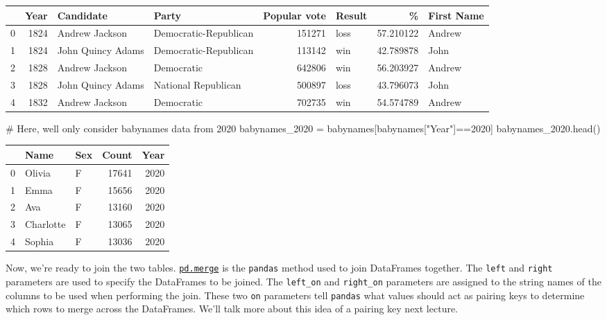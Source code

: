 \documentclass[
  letterpaper,
  DIV=11,
  numbers=noendperiod]{scrreprt}
\newenvironment{Shaded}{\begin{snugshade}}{\end{snugshade}}
\newcommand{\CommentTok}[1]{\textcolor[rgb]{0.37,0.37,0.37}{#1}}
\newcommand{\DecValTok}[1]{\textcolor[rgb]{0.68,0.00,0.00}{#1}}
\newcommand{\NormalTok}[1]{\textcolor[rgb]{0.00,0.23,0.31}{#1}}
\newcommand{\OperatorTok}[1]{\textcolor[rgb]{0.37,0.37,0.37}{#1}}
\newcommand{\StringTok}[1]{\textcolor[rgb]{0.13,0.47,0.30}{#1}}
\begin{document}
\begin{tabular}{lrllrlrl}
\toprule
{} &  Year &          Candidate &                  Party &  Popular vote & Result &          \% & First Name \\
\midrule
0 &  1824 &     Andrew Jackson &  Democratic-Republican &        151271 &   loss &  57.210122 &     Andrew \\
1 &  1824 &  John Quincy Adams &  Democratic-Republican &        113142 &    win &  42.789878 &       John \\
2 &  1828 &     Andrew Jackson &             Democratic &        642806 &    win &  56.203927 &     Andrew \\
3 &  1828 &  John Quincy Adams &    National Republican &        500897 &   loss &  43.796073 &       John \\
4 &  1832 &     Andrew Jackson &             Democratic &        702735 &    win &  54.574789 &     Andrew \\
\bottomrule
\end{tabular}

\begin{Shaded}
\begin{Highlighting}[]
\CommentTok{\# Here, we\textquotesingle{}ll only consider \textasciigrave{}babynames\textasciigrave{} data from 2020}
\NormalTok{babynames\_2020 }\OperatorTok{=}\NormalTok{ babynames[babynames[}\StringTok{"Year"}\NormalTok{]}\OperatorTok{==}\DecValTok{2020}\NormalTok{]}
\NormalTok{babynames\_2020.head()}
\end{Highlighting}
\end{Shaded}

\begin{tabular}{lllrr}
\toprule
{} &       Name & Sex &  Count &  Year \\
\midrule
0 &     Olivia &   F &  17641 &  2020 \\
1 &       Emma &   F &  15656 &  2020 \\
2 &        Ava &   F &  13160 &  2020 \\
3 &  Charlotte &   F &  13065 &  2020 \\
4 &     Sophia &   F &  13036 &  2020 \\
\bottomrule
\end{tabular}

Now, we're ready to join the two tables.
\href{https://pandas.pydata.org/docs/reference/api/pandas.DataFrame.merge.html}{\texttt{pd.merge}}
is the \texttt{pandas} method used to join DataFrames together. The
\texttt{left} and \texttt{right} parameters are used to specify the
DataFrames to be joined. The \texttt{left\_on} and \texttt{right\_on}
parameters are assigned to the string names of the columns to be used
when performing the join. These two \texttt{on} parameters tell
\texttt{pandas} what values should act as pairing keys to determine
which rows to merge across the DataFrames. We'll talk more about this
idea of a pairing key next lecture.
\end{document}
